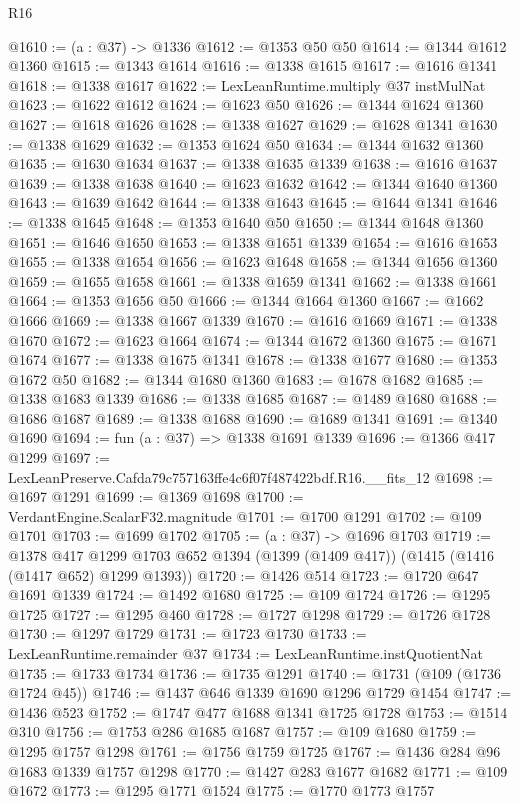\begin{lexlean}{R16}
\begin{coremodule}
@1610 := (a : @37) -> @1336
@1612 := @1353 @50 @50
@1614 := @1344 @1612 @1360
@1615 := @1343 @1614
@1616 := @1338 @1615
@1617 := @1616 @1341
@1618 := @1338 @1617
@1622 := LexLeanRuntime.multiply @37 instMulNat
@1623 := @1622 @1612
@1624 := @1623 @50
@1626 := @1344 @1624 @1360
@1627 := @1618 @1626
@1628 := @1338 @1627
@1629 := @1628 @1341
@1630 := @1338 @1629
@1632 := @1353 @1624 @50
@1634 := @1344 @1632 @1360
@1635 := @1630 @1634
@1637 := @1338 @1635 @1339
@1638 := @1616 @1637
@1639 := @1338 @1638
@1640 := @1623 @1632
@1642 := @1344 @1640 @1360
@1643 := @1639 @1642
@1644 := @1338 @1643
@1645 := @1644 @1341
@1646 := @1338 @1645
@1648 := @1353 @1640 @50
@1650 := @1344 @1648 @1360
@1651 := @1646 @1650
@1653 := @1338 @1651 @1339
@1654 := @1616 @1653
@1655 := @1338 @1654
@1656 := @1623 @1648
@1658 := @1344 @1656 @1360
@1659 := @1655 @1658
@1661 := @1338 @1659 @1341
@1662 := @1338 @1661
@1664 := @1353 @1656 @50
@1666 := @1344 @1664 @1360
@1667 := @1662 @1666
@1669 := @1338 @1667 @1339
@1670 := @1616 @1669
@1671 := @1338 @1670
@1672 := @1623 @1664
@1674 := @1344 @1672 @1360
@1675 := @1671 @1674
@1677 := @1338 @1675 @1341
@1678 := @1338 @1677
@1680 := @1353 @1672 @50
@1682 := @1344 @1680 @1360
@1683 := @1678 @1682
@1685 := @1338 @1683 @1339
@1686 := @1338 @1685
@1687 := @1489 @1680
@1688 := @1686 @1687
@1689 := @1338 @1688
@1690 := @1689 @1341
@1691 := @1340 @1690
@1694 := fun (a : @37) => @1338 @1691 @1339
@1696 := @1366 @417 @1299
@1697 := LexLeanPreserve.Cafda79c757163ffe4c6f07f487422bdf.R16.__fits_12
@1698 := @1697 @1291
@1699 := @1369 @1698
@1700 := VerdantEngine.ScalarF32.magnitude
@1701 := @1700 @1291
@1702 := @109 @1701
@1703 := @1699 @1702
@1705 := (a : @37) -> @1696 @1703
@1719 := @1378
    @417
    @1299
    @1703
    @652
    @1394
    (@1399 (@1409 @417))
    (@1415 (@1416 (@1417 @652) @1299 @1393))
@1720 := @1426 @514
@1723 := @1720 @647 @1691 @1339
@1724 := @1492 @1680
@1725 := @109 @1724
@1726 := @1295 @1725
@1727 := @1295 @460
@1728 := @1727 @1298
@1729 := @1726 @1728
@1730 := @1297 @1729
@1731 := @1723 @1730
@1733 := LexLeanRuntime.remainder @37
@1734 := LexLeanRuntime.instQuotientNat
@1735 := @1733 @1734
@1736 := @1735 @1291
@1740 := @1731 (@109 (@1736 @1724 @45))
@1746 := @1437 @646 @1339 @1690 @1296 @1729 @1454
@1747 := @1436 @523
@1752 := @1747 @477 @1688 @1341 @1725 @1728
@1753 := @1514 @310
@1756 := @1753 @286 @1685 @1687
@1757 := @109 @1680
@1759 := @1295 @1757 @1298
@1761 := @1756 @1759 @1725
@1767 := @1436 @284 @96 @1683 @1339 @1757 @1298
@1770 := @1427 @283 @1677 @1682
@1771 := @109 @1672
@1773 := @1295 @1771 @1524
@1775 := @1770 @1773 @1757

\end{coremodule}
\end{lexlean}
